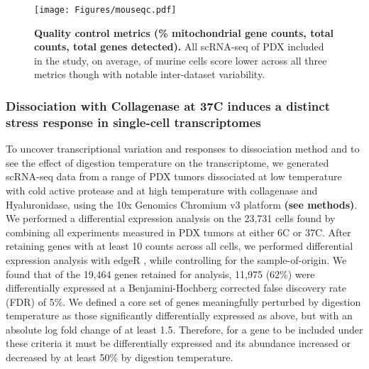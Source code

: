 
\begin{figure}
\centering
\texttt{[image: Figures/mouseqc.pdf]}
	
\caption[Quality control metrics (\% mitochondrial gene counts, total counts, total genes detected)]
	{\small
	\textbf{Quality control metrics (\% mitochondrial gene counts, total counts, total genes detected).}
	   All scRNA-seq of PDX included in the study, on average, of murine cells score lower across all three metrics though with notable inter-dataset variability.
	}
	\label{fig:mouseqc}
\end{figure}



\subsubsection{Dissociation with Collagenase at 37\textdegree C induces a distinct stress response in single-cell transcriptomes}
To uncover transcriptional variation and responses to dissociation method and to see the effect of digestion temperature on the transcriptome, we generated scRNA-seq data from a range of PDX tumors dissociated at low temperature with cold active protease and at high temperature with collagenase and Hyaluronidase, using the 10x Genomics Chromium v3 platform \textbf{(see methods)}.
We performed a differential expression analysis on the 23,731 cells found by combining all experiments measured in PDX tumors at either 6\textdegree C or 37\textdegree C. After retaining genes with at least 10 counts across all cells, we performed differential expression analysis with edgeR \cite{robinson2010edger}, while controlling for the sample-of-origin.
We found that of the 19,464 genes retained for analysis, 11,975 (62\%) were differentially expressed at a Benjamini-Hochberg corrected false discovery rate (FDR) of 5\%. We defined a core set of genes meaningfully perturbed by digestion temperature as those significantly differentially expressed as above, but with an absolute log fold change of at least 1.5. Therefore, for a gene to be included under these criteria it must be differentially expressed and its abundance increased or decreased by at least 50\% by digestion temperature. 


